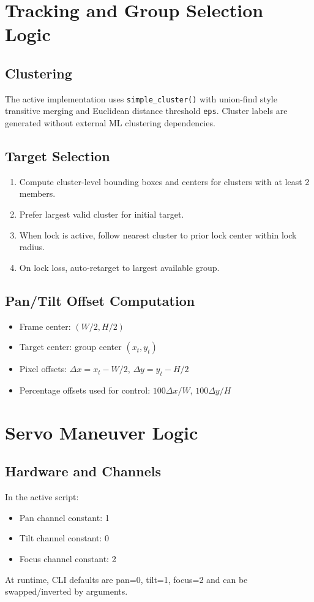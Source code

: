 \documentclass[11pt,a4paper]{article}
\begin{document}
\section{Tracking and Group Selection Logic}
\subsection{Clustering}
The active implementation uses \texttt{simple\_cluster()} with union-find style transitive merging and Euclidean distance threshold \texttt{eps}. Cluster labels are generated without external ML clustering dependencies.

\subsection{Target Selection}
\begin{enumerate}[leftmargin=*]
  \item Compute cluster-level bounding boxes and centers for clusters with at least 2 members.
  \item Prefer largest valid cluster for initial target.
  \item When lock is active, follow nearest cluster to prior lock center within lock radius.
  \item On lock loss, auto-retarget to largest available group.
\end{enumerate}

\subsection{Pan/Tilt Offset Computation}
\begin{itemize}[leftmargin=*]
  \item Frame center: \((W/2, H/2)\)
  \item Target center: group center \((x_t, y_t)\)
  \item Pixel offsets: \(\Delta x = x_t - W/2\), \(\Delta y = y_t - H/2\)
  \item Percentage offsets used for control: \(100\Delta x/W\), \(100\Delta y/H\)
\end{itemize}

\section{Servo Maneuver Logic}
\subsection{Hardware and Channels}
In the active script:
\begin{itemize}[leftmargin=*]
  \item Pan channel constant: 1
  \item Tilt channel constant: 0
  \item Focus channel constant: 2
\end{itemize}
At runtime, CLI defaults are pan=0, tilt=1, focus=2 and can be swapped/inverted by arguments.
\end{document}
